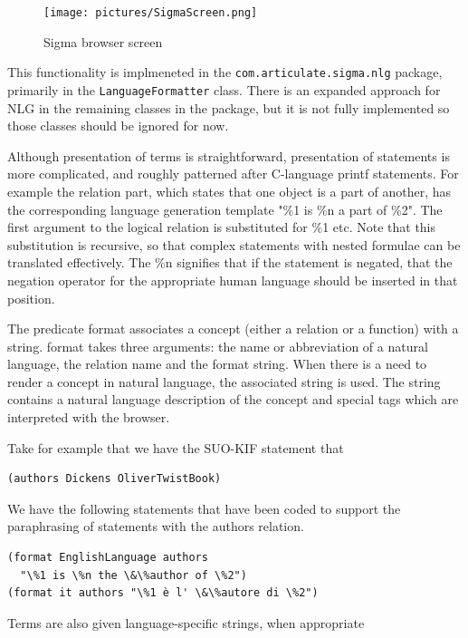 \documentclass{book}
\begin{document}
\begin{figure}
  \centering
  \texttt{[image: pictures/SigmaScreen.png]}
  \caption{Sigma browser screen}
  \label{fig:SigmaScreen}
\end{figure}

This functionality is implmeneted in the \texttt{com.articulate.sigma.nlg}
package, primarily in the \texttt{LanguageFormatter} class.  There is an
expanded approach for NLG in the remaining classes in the package, but it is
not fully implemented so those classes should be ignored for now.

Although presentation of terms is straightforward, presentation of statements is
more complicated, and roughly patterned after C-language printf
statements. For example the relation part, which states that one object is a
part of another, has the corresponding language generation template "\%1 is \%n
a part of \%2". The first argument to the logical relation is substituted for
\%1 etc. Note that this substitution is recursive, so that complex statements
with nested formulae can be translated effectively. The \%n signifies that if
the statement is negated, that the negation operator for the appropriate human
language should be inserted in that position.

The predicate format associates a concept (either a relation or a function) with
a string.  format takes three arguments: the name or abbreviation of a natural
language, the relation name and the format string.  When there is a need to
render a concept in natural language, the associated string is used.  The string
contains a natural language description of the concept and special tags which
are interpreted with the browser.

Take for example that we have the SUO-KIF statement that

\begin{verbatim}
(authors Dickens OliverTwistBook)
\end{verbatim}

We have the following statements that have been coded to support the
paraphrasing of statements with the authors relation.

\begin{verbatim}
(format EnglishLanguage authors 
  "\%1 is \%n the \&\%author of \%2")
(format it authors "\%1 è l' \&\%autore di \%2")
\end{verbatim}

Terms are also given language-specific strings, when appropriate
\end{document}
